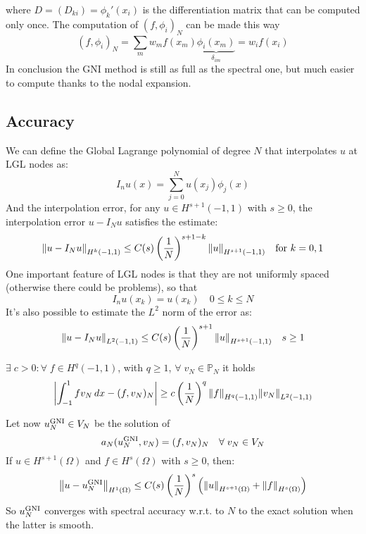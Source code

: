 where \(D = (D_{ki}) = \phi_k'(x_i)\) is the differentiation matrix that can be computed only once. The computation of \((f,\phi_i)_N\) can be made this way 
\[
    (f, \phi_i)_N = \sum_m w_m f(x_m)\underbrace{\phi_i(x_m)}_{\delta_{im}} = w_i f(x_i) 
\]
In conclusion the GNI method is still as full as the spectral one, but much easier to compute thanks to the nodal expansion.
\subsection*{Accuracy}
We can define the Global Lagrange polynomial of degree \(N\) that interpolates \(u\) at LGL nodes as:
\[
    I_nu(x) = \sum_{j=0}^{N}u(x_j)\phi_j(x)
\]
And the interpolation error, for any \(u \in H^{s+1}(-1, 1)\) with \(s \geq 0 \), the interpolation error \(u - I_N u\) satisfies the estimate:
\[
    \norm{u-I_Nu}_{H^k(-1,1)} \leq C(s)\left(\frac{1}{N}\right)^{s+1-k}\norm{u}_{H^{s+1}(-1,1)} \quad \text{for }k = 0,1
\]
One important feature of LGL nodes is that they are not uniformly spaced (otherwise there could be problems), so that 
\[
    I_nu(x_k) = u(x_k) \quad 0 \leq k \leq N
\]
It's also possible to estimate the \(L^2\) norm of the error as:
\[
    \norm{u - I_N u}_{L^2(-1,1)} \leq C(s) \left(\frac{1}{N}\right)^{s+1} \norm{u}_{H^{s+1}(-1,1)} \quad s \geq 1
\]
\begin{theorem}
    \(\exists \; c > 0 : \forall \; f \in H^q(-1,1)\), with \(q \geq 1\), \(\forall \; v_N \in \mathbb{P}_N\) it holds 
    \[
        \abs{\int_{-1}^1 f v_N \, dx - (f, v_N)_N} \geq c \left(\frac{1}{N}\right)^q \norm{f}_{H^q(-1,1)} \norm{v_N}_{L^2(-1,1)}
    \]
\end{theorem}
Let now \(u_N^{\text{GNI}} \in V_N\) be the solution of
\[
     a_N(u_N^{\text{GNI}}, v_N) = (f, v_N)_N \quad \forall \; v_N \in V_N
\]
If \(u \in H^{s+1}(\Omega)\) and \(f \in H^{s}(\Omega)\) with \(s \geq 0\), then:
\[
    \norm{u-u_N^{\text{GNI}}}_{H^1(\Omega)} \leq C(s) \left(\frac{1}{N}\right)^s \left(\norm{u}_{H^{s+1}(\Omega)}+\norm{f}_{H^s(\Omega)}\right)
\]
So \(u_N^{\text{GNI}}\) converges with spectral accuracy w.r.t. to \(N\) to the exact solution when the latter is smooth.

